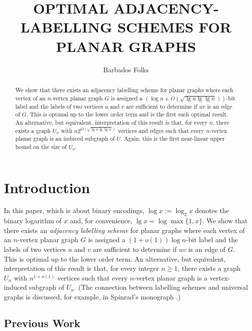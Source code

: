 \documentclass[kpfonts]{patmorin}
\title{\MakeUppercase{Optimal Adjacency-Labelling Schemes for Planar Graphs}}
\author{Barbados Folks}
\begin{document}
\begin{titlepage}
\maketitle

\begin{abstract}
  We show that there exists an adjacency labelling scheme for planar graphs where each vertex of an $n$-vertex planar graph $G$ is assigned a $(\log n+O(\sqrt{\lg n\lg\lg n}))$-bit label and the labels of two vertices $u$ and $v$ are sufficient to determine if $uv$ is an edge of $G$.  This is optimal up to the lower order term and is the first such optimal result.  An alternative, but equivalent, interpretation of this result is that, for every $n$, there exists a graph $U_n$ with $n2^{O(\sqrt{\lg n\lg\lg n})}$ vertices and edges such that every $n$-vertex planar graph is an induced subgraph of $U$.  Again, this is the first near-linear upper bound on the size of $U_n$.
\end{abstract}
\end{titlepage}
\tableofcontents

\newpage

\setcounter{page}{0}
\section{Introduction}

In this paper, which is about binary encodings, $\log x:=\log_2 x$ denotes the binary logarithm of $x$ and, for convenience, $\lg x = \log\max\{1,x\}$.  We show that there exists an \emph{adjacency labelling scheme} for planar graphs where each vertex of an $n$-vertex planar graph $G$ is assigned a $(1+o(1))\log n$-bit label and the labels of two vertices $u$ and $v$ are sufficient to determine if $uv$ is an edge of $G$.  This is optimal up to the lower order term.  An alternative, but equivalent, interpretation of this result is that, for every integer $n\ge 1$, there exists a graph $U_n$ with $n^{1+o(1)}$  vertices such that every $n$-vertex planar graph is a vertex-induced subgraph of $U_n$.  (The connection between labelling schemes and universal graphs is discussed, for example, in Spinrad's monograph \cite[Section~2.1]{spinrad:efficient}.) 

\subsection{Previous Work}
\end{document}

